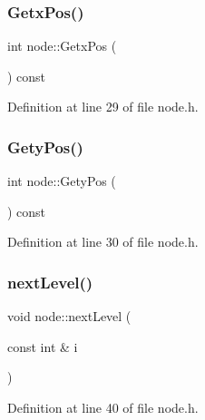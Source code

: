 \subsubsection{\texorpdfstring{Getx\+Pos()}{GetxPos()}}
{\footnotesize\ttfamily int node\+::\+Getx\+Pos (\begin{DoxyParamCaption}{ }\end{DoxyParamCaption}) const\hspace{0.3cm}{\ttfamily [inline]}}



Definition at line 29 of file node.\+h.

\mbox{\label{classnode_a0d644ed02899013bdc6e222afefb4c25}} 
\subsubsection{\texorpdfstring{Gety\+Pos()}{GetyPos()}}
{\footnotesize\ttfamily int node\+::\+Gety\+Pos (\begin{DoxyParamCaption}{ }\end{DoxyParamCaption}) const\hspace{0.3cm}{\ttfamily [inline]}}



Definition at line 30 of file node.\+h.

\mbox{\label{classnode_a04a186013c42fb942b6da90d2e98d4ed}} 
\subsubsection{\texorpdfstring{next\+Level()}{nextLevel()}}
{\footnotesize\ttfamily void node\+::next\+Level (\begin{DoxyParamCaption}\item[{const int \&}]{i }\end{DoxyParamCaption})\hspace{0.3cm}{\ttfamily [inline]}}



Definition at line 40 of file node.\+h.

\mbox{\label{classnode_ad51b92de008bd5107a7b55cc61fc497b}} 
